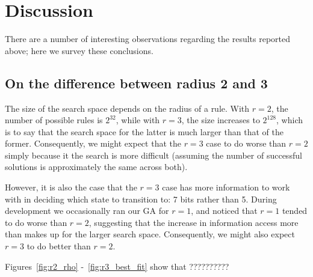 \section{Discussion} \label{discussion}

There are a number of interesting observations regarding the results reported above; here we survey these 
conclusions.

\subsection{On the difference between radius 2 and 3}

The size of the search space depends on the radius of a rule. With $r = 2$, the number of possible rules is $2^{32}$, while 
with $r = 3$, the size increases to $2^{128}$, which is to say that the search space for the latter is much larger than that of 
the former. Consequently, we might expect that the $r = 3$ case to do worse than $r = 2$ simply because it the search is more difficult 
(assuming the number of successful solutions is approximately the same across both). 

However, it is also the case that the $r = 3$ case has more information to work with in deciding which state to transition to: 7 bits rather than 
5. During development we occasionally ran our GA for $r = 1$, and noticed that $r = 1$ tended to do worse than $r = 2$, suggesting that 
the increase in information access more than makes up for the larger search space. Consequently, we might also expect $r = 3$ to do 
better than $r = 2$.

Figures~\ref{fig:r2_rho} -~\ref{fig:r3_best_fit} show that ??????????

